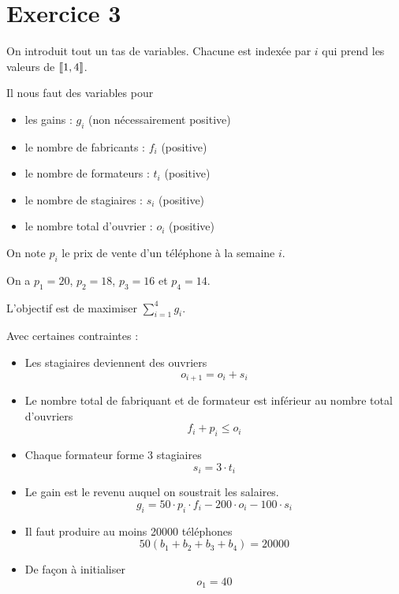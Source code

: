 \section*{Exercice 3}

On introduit tout un tas de variables. Chacune est indexée par $i$ qui prend les valeurs de $\left\llbracket 1, 4 \right\rrbracket$.

Il nous faut des variables pour
\begin{itemize}
    \item les gains : $g_i$ (non nécessairement positive)
    \item le nombre de fabricants : $f_i$ (positive)
    \item le nombre de formateurs : $t_i$ (positive)
    \item le nombre de stagiaires : $s_i$ (positive)
    \item le nombre total d'ouvrier : $o_i$ (positive)
\end{itemize}

On note $p_i$ le prix de vente d'un téléphone à la semaine $i$.

On a $p_1 = 20$, $p_2 = 18$, $p_3 = 16$ et $p_4 = 14$.

L'objectif est de maximiser $\sum\limits_{i=1}^4 g_i$.

Avec certaines contraintes :
\begin{itemize}
    \item Les stagiaires deviennent des ouvriers
        \[
            o_{i+1} =  o_i + s_i
        \]
    \item Le nombre total de fabriquant et de formateur est inférieur au nombre total d'ouvriers
        \[
            f_i+p_i \leqslant o_i
        \]
    \item Chaque formateur forme 3 stagiaires
        \[
            s_i=3\cdot t_i        
        \]
    \item Le gain est le revenu auquel on soustrait les salaires.
        \[
            g_i = 50\cdot p_i \cdot f_i-200\cdot o_i-100\cdot s_i
        \]
    \item Il faut produire au moins 20000 téléphones
        \[
            50(b_1+b_2+b_3+b_4) = 20000
        \]
    \item De façon à initialiser
        \[
            o_1 = 40
        \]
\end{itemize}




